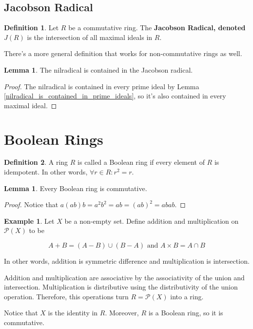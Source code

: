 \documentclass{article}
\theoremstyle{definition}
\newtheorem{definition}{Definition}
\newtheorem{lemma}[theorem]{Lemma}
\newtheorem{example}[theorem]{Example}
\begin{document}
\subsection{Jacobson Radical}

\begin{definition}
    Let $R$ be a commutative ring. The \textbf{Jacobson Radical, denoted $J(R)$}
    is the intersection of all maximal ideals in $R$.
\end{definition}

There's a more general definition that works for non-commutative rings 
as well.

\begin{lemma}
    The nilradical is contained in the Jacobson radical.
\end{lemma}
\begin{proof}
    The nilradical is contained in every prime ideal by Lemma \ref{nilradical_is_contained_in_prime_ideals},
    so it's also contained in every maximal ideal.
\end{proof}

\newpage

\section{Boolean Rings}

\begin{definition}
    A ring $R$ is called a Boolean ring if every element of $R$ is idempotent.
    In other words, $\forall r \in R: r^{2} = r$.
\end{definition}

\begin{lemma}
    Every Boolean ring is commutative.
\end{lemma}
\begin{proof}
    Notice that $a(ab)b = a^{2}b^{2} = ab = (ab)^{2} = abab$.
\end{proof}

\begin{example}
    Let $X$ be a non-empty set. Define addition and multiplication on $\mathcal{P}(X)$ to be

    \[ A + B = (A - B) \cup (B - A) \text{  and   } A \times B = A \cap B \]

    In other words, addition is symmetric difference and multiplication is intersection.

    Addition and multiplication are associative by the associativity of the union and intersection.
    Multiplication is distributive using the distributivity of the union operation. Therefore,
    this operations turn $R = \mathcal{P}(X)$ into a ring.

    Notice that $X$ is the identity in $R$. Moreover, $R$ is a Boolean ring, so it is commutative.
\end{example}
\end{document}
